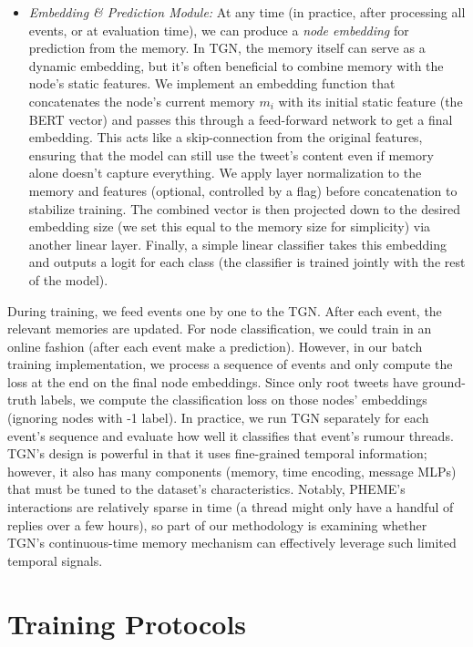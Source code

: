 \documentclass{cshonours}
\begin{document}
\begin{itemize}
\item \emph{Embedding \& Prediction Module:} At any time (in practice, after processing all events, or at evaluation time), we can produce a \emph{node embedding} for prediction from the memory. In TGN, the memory itself can serve as a dynamic embedding, but it's often beneficial to combine memory with the node's static features. We implement an embedding function that concatenates the node's current memory $m_i$ with its initial static feature (the BERT vector) and passes this through a feed-forward network to get a final embedding. This acts like a skip-connection from the original features, ensuring that the model can still use the tweet's content even if memory alone doesn't capture everything. We apply layer normalization to the memory and features (optional, controlled by a flag) before concatenation to stabilize training. The combined vector is then projected down to the desired embedding size (we set this equal to the memory size for simplicity) via another linear layer. Finally, a simple linear classifier takes this embedding and outputs a logit for each class (the classifier is trained jointly with the rest of the model).
\end{itemize}

During training, we feed events one by one to the TGN. After each event, the relevant memories are updated. For node classification, we could train in an online fashion (after each event make a prediction). However, in our batch training implementation, we process a sequence of events and only compute the loss at the end on the final node embeddings. Since only root tweets have ground-truth labels, we compute the classification loss on those nodes' embeddings (ignoring nodes with -1 label). In practice, we run TGN separately for each event's sequence and evaluate how well it classifies that event's rumour threads. TGN's design is powerful in that it uses fine-grained temporal information; however, it also has many components (memory, time encoding, message MLPs) that must be tuned to the dataset's characteristics. Notably, PHEME's interactions are relatively sparse in time (a thread might only have a handful of replies over a few hours), so part of our methodology is examining whether TGN's continuous-time memory mechanism can effectively leverage such limited temporal signals.

\section{Training Protocols}
\end{document}
